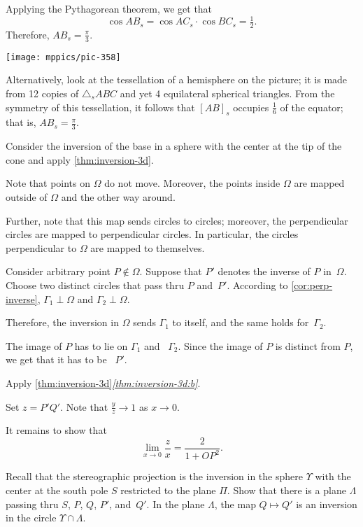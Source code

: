\begin{multicols}{2}
Applying the Pythagorean theorem, we get that
$$
\cos AB_s=\cos AC_s\cdot\cos BC_s=\tfrac12.
$$
Therefore, $AB_s=\tfrac\pi3$.



\begin{Figure}
\vskip-0mm
\centering
\texttt{[image: mppics/pic-358]}
\end{Figure}

Alternatively, 
look at the tessellation of a hemisphere on the picture; 
it is made from 12 copies of $\triangle_s A B C$ and yet 4 equilateral spherical triangles.
From the symmetry of this tessellation, it follows that $[AB]_s$ occupies $\tfrac16$ of the equator; that is, $AB_s=\tfrac\pi3$.

Consider the inversion of the base in a sphere with the center at the tip of the cone and apply \ref{thm:inversion-3d}.

Note that points on $\Omega$ do not move.
Moreover, the points inside $\Omega$ 
are mapped outside of $\Omega$ and the other way around.


Further, note that this map sends circles to circles;
moreover, the perpendicular circles are mapped to perpendicular circles.
In particular, the circles perpendicular to $\Omega$ are mapped to themselves.

Consider arbitrary point $P\notin\Omega$.
Suppose that $P'$ denotes the inverse of $P$ in~$\Omega$.
Choose two distinct circles that pass thru $P$ and~$P'$.
According to \ref{cor:perp-inverse}, 
$\Gamma_1\perp \Omega$ and $\Gamma_2\perp \Omega$.

Therefore, the inversion in $\Omega$ sends $\Gamma_1$ to itself, and the same holds for~$\Gamma_2$. 

The image of $P$ has to lie on $\Gamma_1$ and ~$\Gamma_2$.
Since the image of $P$ is distinct from $P$, we get that it has to be ~$P'$.

Apply \ref{thm:inversion-3d}\textit{\ref{thm:inversion-3d:b}}.

Set $z=P'Q'$.
Note that $\tfrac yz\to 1$ as $x\to 0$.

It remains to show that 
$$\lim_{x\to 0} \frac{z}{x}=\frac{2}{1+OP^2}.$$

Recall that the stereographic projection is the inversion in the sphere $\Upsilon$ with the center at the south pole $S$ restricted to the plane $\Pi$.
Show that there is a plane $\Lambda$ passing thru $S$, $P$, $Q$, $P'$, and~$Q'$.
In the plane $\Lambda$, the map $Q\mapsto Q'$ is an inversion in the circle $\Upsilon\cap \Lambda$.


\end{multicols}
